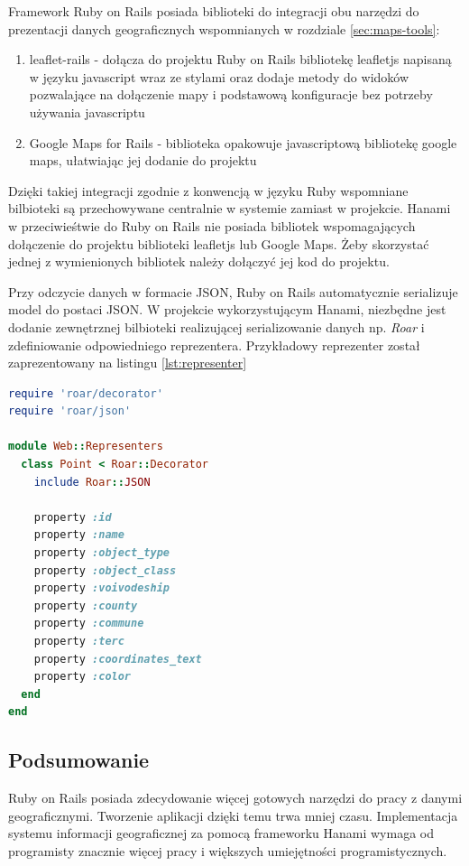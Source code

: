 \documentclass[printmode]{mgr}
\begin{document}
Framework Ruby on Rails posiada biblioteki do integracji obu narzędzi do prezentacji danych geograficznych wspomnianych w rozdziale \ref{sec:maps-tools}:
\begin{enumerate}
  \item{leaflet-rails} - dołącza do projektu Ruby on Rails bibliotekę leafletjs napisaną w języku javascript wraz ze stylami oraz dodaje metody do widoków pozwalające na dołączenie mapy i podstawową konfiguracje bez potrzeby używania javascriptu
  \item{Google Maps for Rails} - biblioteka opakowuje javascriptową bibliotekę google maps, ułatwiając jej dodanie do projektu
\end{enumerate}
Dzięki takiej integracji zgodnie z konwencją w języku Ruby\cite{doc_ruby}  wspomniane bilbioteki są przechowywane centralnie w systemie zamiast w projekcie.
Hanami w przeciwieśtwie do Ruby on Rails nie posiada bibliotek wspomagających dołączenie do projektu biblioteki leafletjs lub Google Maps. Żeby skorzystać jednej z wymienionych bibliotek należy dołączyć jej kod do projektu.

Przy odczycie danych w formacie JSON, Ruby on Rails automatycznie serializuje model do postaci JSON. W projekcie wykorzystującym Hanami, niezbędne jest dodanie zewnętrznej bilbioteki realizującej serializowanie danych np. \textit{Roar} i zdefiniowanie odpowiedniego reprezentera. Przykładowy reprezenter został zaprezentowany na listingu \ref{lst:representer}

 \begin{lstlisting}[language=Ruby, caption={Reprezenter dla modelu Point}, label=lst:representer]
require 'roar/decorator'
require 'roar/json'

module Web::Representers
  class Point < Roar::Decorator
    include Roar::JSON

    property :id
    property :name
    property :object_type
    property :object_class
    property :voivodeship
    property :county
    property :commune
    property :terc
    property :coordinates_text
    property :color
  end
end
\end{lstlisting}

\subsection{Podsumowanie}

Ruby on Rails posiada zdecydowanie więcej gotowych narzędzi do pracy z danymi geograficznymi. Tworzenie aplikacji dzięki temu trwa mniej czasu. Implementacja systemu informacji geograficznej za pomocą frameworku Hanami wymaga od programisty znacznie więcej pracy i większych umiejętności programistycznych.
\end{document}

